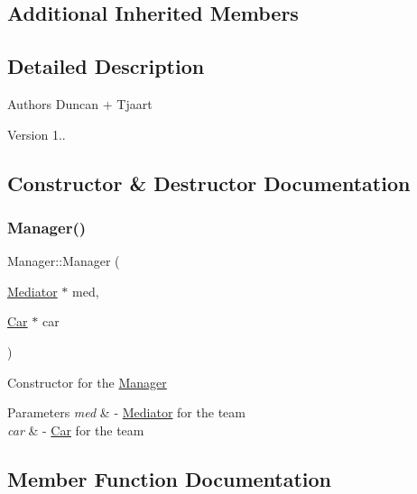 \subsection*{Additional Inherited Members}


\subsection{Detailed Description}
\begin{DoxyAuthor}{Authors}
Duncan + Tjaart 
\end{DoxyAuthor}
\begin{DoxyVersion}{Version}
1.. 
\end{DoxyVersion}


\subsection{Constructor \& Destructor Documentation}
\mbox{\label{class_manager_a27582343c4557e4ececb1ae1a6c8080b}} 
\subsubsection{\texorpdfstring{Manager()}{Manager()}}
{\footnotesize\ttfamily Manager\+::\+Manager (\begin{DoxyParamCaption}\item[{\mbox{\hyperlink{class_mediator}{Mediator}} $\ast$}]{med,  }\item[{\mbox{\hyperlink{class_car}{Car}} $\ast$}]{car }\end{DoxyParamCaption})\hspace{0.3cm}{\ttfamily [inline]}}

Constructor for the \mbox{\hyperlink{class_manager}{Manager}} 
\begin{DoxyParams}{Parameters}
{\em med} & -\/ \mbox{\hyperlink{class_mediator}{Mediator}} for the team \\
\hline
{\em car} & -\/ \mbox{\hyperlink{class_car}{Car}} for the team \\
\hline
\end{DoxyParams}


\subsection{Member Function Documentation}
\mbox{\label{class_manager_a4f22d596754a0a099c9b467eadcb408f}} 
